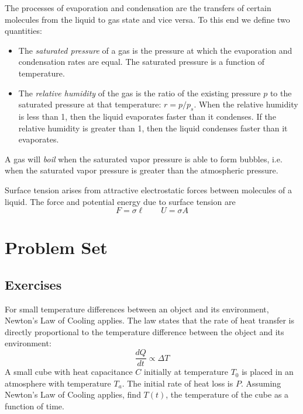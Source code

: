 \documentclass[11pt]{scrartcl}
\begin{document}
\begin{theorem}
    The processes of evaporation and condensation are the transfers of certain molecules from the liquid to gas state and vice versa. To this end we define two quantities: \begin{itemize}
        \item The \textit{saturated pressure} of a gas is the pressure at which the evaporation and condensation rates are equal. The saturated pressure is a function of temperature.
        \item The \textit{relative humidity} of the gas is the ratio of the existing pressure $p$ to the saturated pressure at that temperature: $r=p/p_s$. When the relative humidity is less than 1, then the liquid evaporates faster than it condenses. If the relative humidity is greater than 1, then the liquid condenses faster than it evaporates. 
    \end{itemize}
    A gas will \textit{boil} when the saturated vapor pressure is able to form bubbles, i.e. when the saturated vapor pressure is greater than the atmospheric pressure. 
\end{theorem}

\begin{defn}
    Surface tension arises from attractive electrostatic forces between molecules of a liquid. The force and potential energy due to surface tension are $$F=\sigma \ell\qquad U=\sigma A$$
\end{defn}

\section{Problem Set}

\subsection{Exercises}



\begin{prob}
    For small temperature differences between an object and its environment, Newton's Law of Cooling applies. The law states that the rate of heat transfer is directly proportional to the temperature difference between the object and its environment: $$\frac{dQ}{dt}\propto \Delta T$$A small cube with heat capacitance $C$ initially at temperature $T_0$ is placed in an atmosphere with temperature $T_a$. The initial rate of heat loss is $P$. Assuming Newton's Law of Cooling applies, find $T(t)$, the temperature of the cube as a function of time. 
\end{prob}
\end{document}
